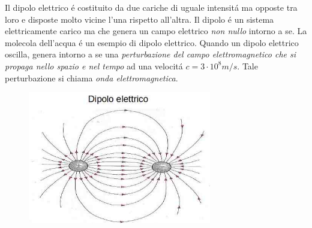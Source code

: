 \documentclass[17pt]{article}
\begin{document}
Il dipolo elettrico \'e costituito da due cariche di uguale intensit\'a ma opposte tra loro e disposte molto vicine l'una rispetto all'altra. Il dipolo \'e un sistema elettricamente carico ma che genera un campo elettrico \emph{non nullo} intorno a se. La molecola dell'acqua \'e un esempio di dipolo elettrico. Quando un dipolo elettrico oscilla, genera intorno a se una \emph{perturbazione del campo elettromagnetico che si propaga nello spazio e nel tempo} ad una velocit\'a $c = 3\cdot 10^{8}m/s$. Tale perturbazione si chiama \emph{onda elettromagnetica}.

\begin{figure}[th]
\includegraphics[width=8cm]{dipoloElettrico.jpg}
\centering
\end{figure}
\end{document}

